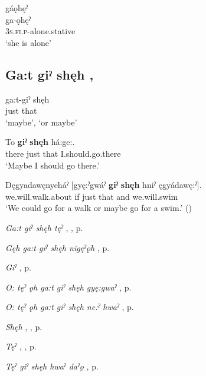 \ea
\label{ex:gpar41}
\glll gáǫhęˀ\\
ga-ǫhęˀ\\
\textsc{3s.fi.p}-alone.stative\\
\glt ‘she is alone’
\z


\subsection*{\textbf{Ga:t giˀ shęh} , } \label{p:[ga:t giˀ shęh]}

\ea
\label{ex:gpar42}
\gll ga:t-giˀ shęh\\
just that\\
\glt ‘maybe’, ‘or maybe’
\z


\ea
\label{ex:gpar43}
\gll To \textbf{giˀ} \textbf{shęh} há:ge:.\\
there just that I.should.go.there\\
\glt ‘Maybe I should go there.’
\z


\ea
\label{ex:gpar44}
\gll Dęgyadawęnyeháˀ [gyę:ˀgwáˀ \textbf{giˀ} \textbf{shęh} hniˀ ęgyádawę:ˀ].\\
we.will.walk.about if just that and we.will.swim\\
\glt ‘We could go for a walk or maybe go for a swim.’ (\cite[45]{michelson_ontario_2011})
\z


\begin{CayugaRelated}
\item \textit{Ga:t giˀ shęh tęˀ} , , p. \pageref{p:[ga:t giˀ shęh tęˀ]}\\
\item \textit{Gęh ga:t giˀ shęh nigęˀǫh} , p. \pageref{p:[gęh ga:t giˀ shęh nigęˀǫh]}\\
\item \textit{Giˀ} , p. \pageref{p:[giˀ]}\\
\item \textit{O: tęˀ ǫh ga:t giˀ shęh gyę:gwaˀ} , p. \pageref{p:[o: tęˀ ǫh ga:t giˀ shęh gyę:gwaˀ]}\\
\item \textit{O: tęˀ ǫh ga:t giˀ shęh ne:ˀ hwaˀ} , p. \pageref{p:[o: tęˀ ǫh ga:t giˀ shęh ne:ˀ hwaˀ]}\\
\item \textit{Shęh} , , p. \pageref{p:[shęh] `because’}\\
\item \textit{Tęˀ} , , p. \pageref{p:[tęˀ]}\\
\item \textit{Tęˀ giˀ shęh hwaˀ daˀǫ} , p. \pageref{p:[tęˀ giˀ shęh hwaˀ daˀǫ]}
\end{CayugaRelated}


